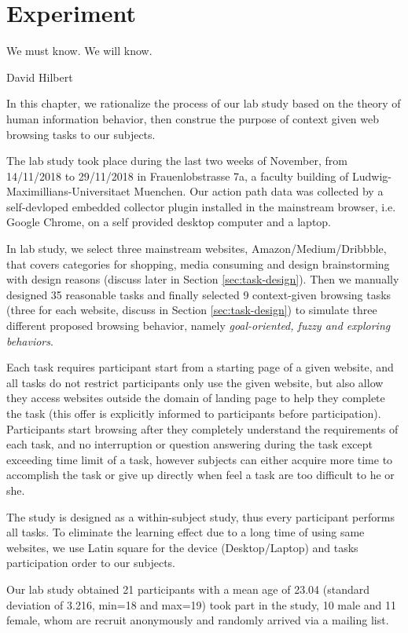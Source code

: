 \section{Experiment}
\label{ch:exp}

\epigraph{We must know. We will know.}{David Hilbert}

In this chapter, we rationalize the process of our lab study based on the theory of
human information behavior, then construe the purpose of context given web browsing tasks 
to our subjects.

The lab study took place during the last two weeks of November, from 14/11/2018 to 29/11/2018
in Frauenlobstrasse 7a, a faculty building of Ludwig-Maximillians-Universitaet Muenchen.
Our action path data was collected by a self-devloped embedded collector plugin installed in 
the mainstream browser, i.e. Google Chrome, on a self provided desktop computer and a laptop.

In lab study, we select three mainstream websites, Amazon/Medium/Dribbble, 
that covers categories for shopping, media consuming and design brainstorming with design 
reasons (discuss later in Section \ref{sec:task-design}).
Then we manually designed 35 reasonable tasks and finally selected 9 
context-given browsing tasks (three for each website, discuss in 
Section \ref{sec:task-design}) to simulate three different proposed browsing behavior,
namely \emph{goal-oriented, fuzzy and exploring behaviors}.

Each task requires participant start from a starting page of a given website, and
all tasks do not restrict participants only use the given website, but also allow they 
access websites outside the domain of landing page to help they complete the task 
(this offer is explicitly informed to participants before participation).
Participants start browsing after they completely understand the requirements of 
each task, and no interruption or question answering during the task
except exceeding time limit of a task, however subjects can either acquire more time 
to accomplish the task or give up directly when feel a task are too difficult to he or she.

The study is designed as a within-subject study, thus every participant performs all tasks. 
To eliminate the learning effect due to a long time of using same websites, 
we use Latin square \cite{cochran1950experimental} 
for the device (Desktop/Laptop) and tasks participation order to our subjects.

Our lab study obtained 21 participants with a mean age of 23.04 (standard deviation of 3.216, 
min=18 and max=19) took part in the study, 10 male and 11 female, whom are recruit 
anonymously and randomly arrived via a mailing list.

